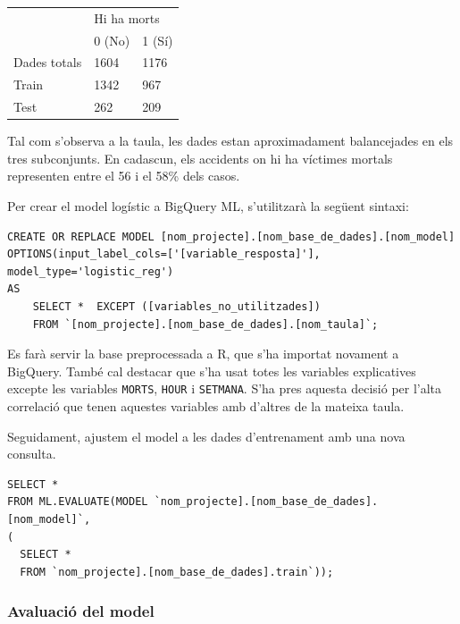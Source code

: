 \documentclass[11pt,longbibliography]{article}
\theoremstyle{definition}
\theoremstyle{remark}
\begin{document}
\begin{table}[H]
\centering
\begin{tabular}{l|ll|}
\cline{2-3}
                                   & \multicolumn{2}{l|}{Hi ha morts}     \\ \cline{2-3} 
                                   & \multicolumn{1}{l|}{0 (No)} & 1 (Sí) \\ \hline
\multicolumn{1}{|l|}{Dades totals} & \multicolumn{1}{l|}{1604}   & 1176   \\ \hline
\multicolumn{1}{|l|}{Train}        & \multicolumn{1}{l|}{1342}   & 967    \\ \hline
\multicolumn{1}{|l|}{Test}         & \multicolumn{1}{l|}{262}    & 209    \\ \hline
\end{tabular}
\end{table}


Tal com s'observa a la taula, les dades estan aproximadament balancejades en els tres subconjunts. En cadascun, els accidents on hi ha víctimes mortals representen entre el 56 i el 58\% dels casos.


Per crear el model logístic a BigQuery ML, s'utilitzarà la següent sintaxi:


\begin{verbatim}
CREATE OR REPLACE MODEL [nom_projecte].[nom_base_de_dades].[nom_model] 
OPTIONS(input_label_cols=['[variable_resposta]'], model_type='logistic_reg') 
AS 
	SELECT *  EXCEPT ([variables_no_utilitzades])
	FROM `[nom_projecte].[nom_base_de_dades].[nom_taula]`;
\end{verbatim}


Es farà servir la base preprocessada a R, que s'ha importat novament a BigQuery. També cal destacar que s'ha usat totes les variables explicatives excepte les variables \texttt{MORTS}, \texttt{HOUR} i \texttt{SETMANA}. S'ha pres aquesta decisió per l'alta correlació que tenen aquestes variables amb d'altres de la mateixa taula. 

Seguidament, ajustem el model a les dades d'entrenament amb una nova consulta.


\begin{verbatim}
SELECT *
FROM ML.EVALUATE(MODEL `nom_projecte].[nom_base_de_dades].[nom_model]`, 
(
  SELECT * 
  FROM `nom_projecte].[nom_base_de_dades].train`));
\end{verbatim}


\subsubsection{Avaluació del model}
\end{document}
